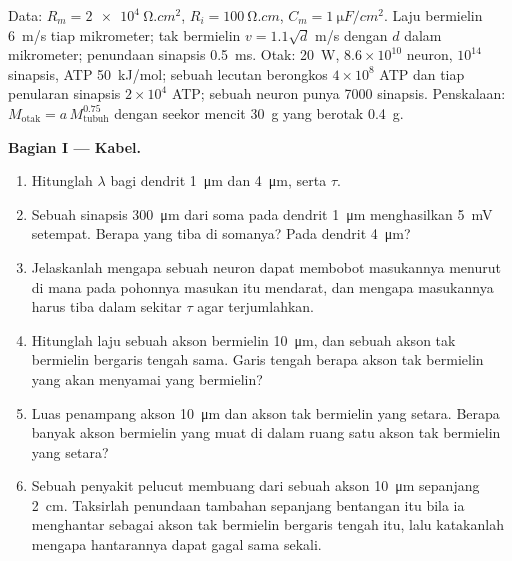 \begin{problem}
\label{pb:b3:nervous-systems:1}
Data: $R_{m} = \qty{2e4}{\ohm.cm^2}$, $R_{i} = \qty{100}{\ohm.cm}$,
$C_{m} = \qty{1}{\micro F/cm^2}$. Laju bermielin \qty{6}{m/s} tiap
mikrometer; tak bermielin $v = 1.1\sqrt{d}$ m/s dengan $d$ dalam
mikrometer; penundaan sinapsis \qty{0.5}{ms}. Otak: \qty{20}{W},
$8.6\times 10^{10}$ neuron, $10^{14}$ sinapsis, ATP \qty{50}{kJ/mol};
sebuah lecutan berongkos $4\times 10^{8}$ ATP dan tiap penularan sinapsis
$2\times 10^{4}$ ATP; sebuah neuron punya \num{7000} sinapsis. Penskalaan:
$M_{\text{otak}} = a\,M_{\text{tubuh}}^{0.75}$ dengan seekor mencit \qty{30}{g}
yang berotak \qty{0.4}{g}.

\medskip
\noindent\textbf{Bagian I --- Kabel.}
\begin{enumerate}
  \item Hitunglah $\lambda$ bagi dendrit \qty{1}{\micro m} dan
        \qty{4}{\micro m}, serta $\tau$.
  \item Sebuah sinapsis \qty{300}{\micro m} dari soma pada dendrit
        \qty{1}{\micro m} menghasilkan \qty{5}{mV} setempat. Berapa yang
        tiba di somanya? Pada dendrit \qty{4}{\micro m}?
  \item Jelaskanlah mengapa sebuah neuron dapat membobot masukannya menurut di
        mana pada pohonnya masukan itu mendarat, dan mengapa masukannya harus tiba
        dalam sekitar $\tau$ agar terjumlahkan.
  \item Hitunglah laju sebuah akson bermielin \qty{10}{\micro m},
        dan sebuah akson tak bermielin bergaris tengah sama. Garis tengah berapa
        akson tak bermielin yang akan menyamai yang bermielin?
  \item Luas penampang akson \qty{10}{\micro m} dan
        akson tak bermielin yang setara. Berapa banyak akson bermielin yang muat di
        dalam ruang satu akson tak bermielin yang setara?
  \item Sebuah penyakit pelucut  membuang  dari sebuah akson
        \qty{10}{\micro m} sepanjang \qty{2}{cm}. Taksirlah penundaan tambahan
        sepanjang bentangan itu bila ia menghantar sebagai akson tak bermielin
        bergaris tengah itu, lalu katakanlah mengapa hantarannya dapat gagal sama sekali.
\end{enumerate}


\end{problem}
